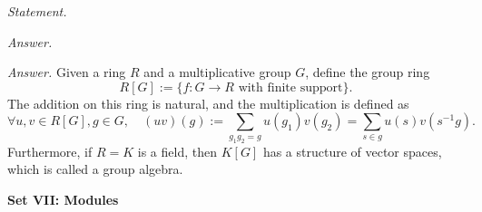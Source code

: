 \documentclass{mathproblems}
\begin{document}
\begin{questions}
\textit{Statement.} 

\textit{Answer.}


\textit{Answer.} Given a ring $R$ and a multiplicative group $G$, define the group ring
$$
R[G]:=\{f:G\to R \text{ with finite support}\}.
$$
The addition on this ring is natural, and the multiplication is defined as
$$
\forall u,v\in R[G],g\in G,\quad (u v)(g):=\sum_{g_1 g_2=g}u(g_1)v(g_2)=\sum_{s\in g} u(s) v(s^{-1}g).
$$
Furthermore, if $R=K$ is a field, then $K[G]$ has a structure of vector spaces, which is called a group algebra.

\end{questions}

\newpage
\centerline{\textbf{Set VII: Modules}}
\end{document}
